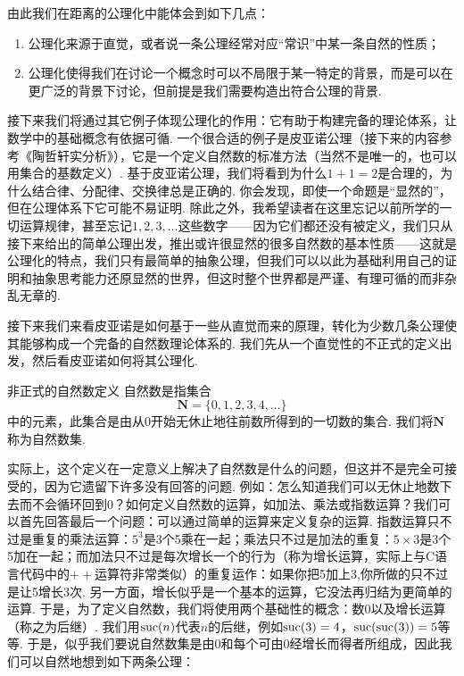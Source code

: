 由此我们在距离的公理化中能体会到如下几点：
\begin{enumerate}
    \item 公理化来源于直觉，或者说一条公理经常对应``常识''中某一条自然的性质；

    \item 公理化使得我们在讨论一个概念时可以不局限于某一特定的背景，而是可以在更广泛的背景下讨论，但前提是我们需要构造出符合公理的背景.
\end{enumerate}

接下来我们将通过其它例子体现公理化的作用：它有助于构建完备的理论体系，让数学中的基础概念有依据可循. 一个很合适的例子是皮亚诺公理（接下来的内容参考《陶哲轩实分析》），它是一个定义自然数的标准方法（当然不是唯一的，也可以用集合的基数定义）. 基于皮亚诺公理，我们将看到为什么$1+1=2$是合理的，为什么结合律、分配律、交换律总是正确的. 你会发现，即使一个命题是``显然的''，但在公理体系下它可能不易证明. 除此之外，我希望读者在这里忘记以前所学的一切运算规律，甚至忘记$1,2,3,\ldots$这些数字——因为它们都还没有被定义，我们只从接下来给出的简单公理出发，推出或许很显然的很多自然数的基本性质——这就是公理化的特点，我们只有最简单的抽象公理，但我们可以以此为基础利用自己的证明和抽象思考能力还原显然的世界，但这时整个世界都是严谨、有理可循的而非杂乱无章的.

接下来我们来看皮亚诺是如何基于一些从直觉而来的原理，转化为少数几条公理使其能够构成一个完备的自然数理论体系的. 我们先从一个直觉性的不正式的定义出发，然后看皮亚诺如何将其公理化.

\begin{definition}{非正式的自然数定义}{}
    自然数是指集合
    \[\mathbf{N}=\{0,1,2,3,4,\ldots\}\]
    中的元素，此集合是由从0开始无休止地往前数所得到的一切数的集合. 我们将$\mathbf{N}$称为自然数集.
\end{definition}

实际上，这个定义在一定意义上解决了自然数是什么的问题，但这并不是完全可接受的，因为它遗留下许多没有回答的问题. 例如：怎么知道我们可以无休止地数下去而不会循环回到0？如何定义自然数的运算，如加法、乘法或指数运算？我们可以首先回答最后一个问题：可以通过简单的运算来定义复杂的运算. 指数运算只不过是重复的乘法运算：$5^3$是3个5乘在一起；乘法只不过是加法的重复：$5\times 3$是3个5加在一起；而加法只不过是每次增长一个的行为（称为增长运算，实际上与C语言代码中的$++$运算符非常类似）的重复运作：如果你把5加上3,你所做的只不过是让5增长3次. 另一方面，增长似乎是一个基本的运算，它没法再归结为更简单的运算. 于是，为了定义自然数，我们将使用两个基础性的概念：数0以及增长运算（称之为后继）. 我们用$\operatorname{suc}(n)$代表$n$的后继，例如$\operatorname{suc}(3)=4$，$\operatorname{suc}(\operatorname{suc}(3))=5$等等. 于是，似乎我们要说自然数集是由0和每个可由0经增长而得者所组成，因此我们可以自然地想到如下两条公理：

